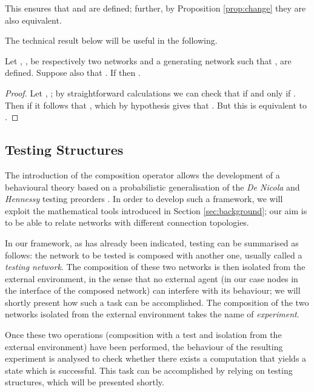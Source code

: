 \documentclass{LMCS}
\begin{document}
{\begin{exa}
This ensures that  and  are 
defined; further, by Proposition \ref{prop:change} 
they are also equivalent.
\end{exa}

The technical result below will be useful in the following.
\begin{lem}
\label{lem:input.struct}
Let , ,  be respectively two networks and 
a generating network such that ,  
are defined. Suppose also that .
If  then .
\end{lem}

\begin{proof}
Let , ; by straightforward calculations 
we can check that  
if and only if . 
Then if  it follows that , 
which by hypothesis gives that . But this is equivalent 
to .
\end{proof}




}
\subsection{Testing Structures}
\label{sec:ts}

The introduction of the composition operator  allows the development of 
a behavioural theory based on a probabilistic 
generalisation of  the  \textit{De Nicola} and \textit{Hennessy}  testing preorders \cite{dnh}. In order to develop 
such a framework, we will exploit the mathematical tools introduced in Section \ref{sec:background}; our aim is 
 to be able to relate networks with different connection topologies.

In our framework, as has already been indicated, testing can be summarised as follows: the network to be tested  is 
composed with another one, usually called a \emph{testing network}. 
The composition of these two networks is then isolated from the external environment, 
in the sense that no external agent (in our case nodes in the interface of the composed network) 
can interfere with its behaviour; we will shortly present how such a task can be 
accomplished. The composition of the two networks isolated from the external 
environment takes the name of \emph{experiment}. 



Once these two operations (composition with a test and isolation from the external environment) 
have been performed, the behaviour of the resulting experiment is analysed to check whether 
there exists a computation that yields a state which is successful. This task can be 
accomplished by relying on testing structures, which will be presented shortly.
\end{document}
